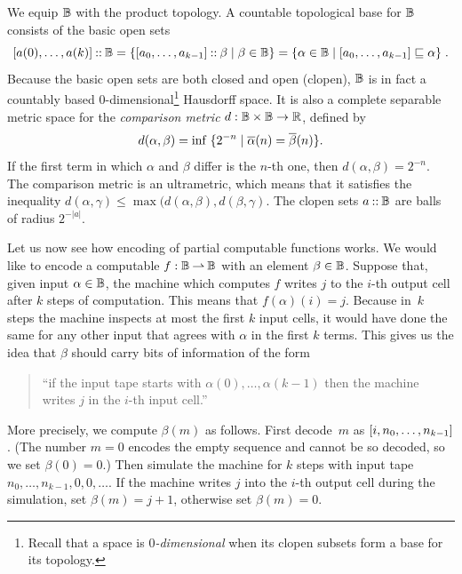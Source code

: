 We equip $\mathbb{B}$ with the product topology. A countable topological
base for $\mathbb{B}$ consists of the basic open sets
%
\begin{equation*}
  [a(0), \ldots, a(k)] \mathbin{{:}{:}} \mathbb{B}
  = \{[a_0, \ldots, a_{k-1}] \mathbin{{:}{:}} \beta \mid \beta \in \mathbb{B}\}
  = \{\alpha \in \mathbb{B} \mid [a_0, \ldots, a_{k-1}]
    \sqsubseteq \alpha\}
  \;.
\end{equation*}
%
Because the basic open sets are both closed and open (clopen),
$\mathbb{B}$ is in fact a countably based $0$-dimensional\footnote{Recall
  that a space is \emph{$0$-dimensional} when its clopen subsets form
  a base for its topology.} Hausdorff space. It is also a complete
separable metric space for the \emph{comparison metric} $d : \mathbb{B}
\times \mathbb{B} \to \mathbb{R}$, defined by
%
\begin{equation*}
  d(\alpha, \beta) = \inf \;\{2^{-n} \mid
    \overline{\alpha}(n) = \overline{\beta}(n)\}.
\end{equation*}
%
If the first term in which $\alpha$ and $\beta$ differ is the $n$-th
one, then $d(\alpha, \beta) = 2^{-n}$. The comparison metric is an
ultrametric, which means that it satisfies the inequality $d(\alpha,
\gamma) \leq \max(d(\alpha, \beta), d(\beta, \gamma)$. The clopen sets
$a \mathbin{{:}{:}} \mathbb{B}$ are balls of radius $2^{-|a|}$.

Let us now see how encoding of partial computable functions works. We
would like to encode a computable $f : \mathbb{B} \mathbin{\rightharpoonup} \mathbb{B}$ with an
element $\beta \in \mathbb{B}$. Suppose that, given input $\alpha \in
\mathbb{B}$, the machine which computes $f$ writes $j$ to the $i$-th
output cell after $k$ steps of computation. This means that
$f(\alpha)(i) = j$. Because in~$k$ steps the machine inspects at most
the first $k$ input cells, it would have done the same for any other
input that agrees with $\alpha$ in the first $k$ terms. This gives us
the idea that $\beta$ should carry bits of information of the form
%
\begin{quote}
  ``if the input tape starts with $\alpha(0), \ldots,
  \alpha(k-1)$ then the machine writes $j$ in the $i$-th input
  cell.''
\end{quote}
%
More precisely, we compute $\beta(m)$ as follows. First decode~$m$ as
$[i, n_0, \ldots, n_{k-1}]$. (The number $m = 0$ encodes the empty
sequence and cannot be so decoded, so we set $\beta(0) = 0$.) Then
simulate the machine for $k$ steps with input tape $n_0, \ldots,
n_{k-1}, 0, 0, \ldots$. If the machine writes $j$ into the $i$-th
output cell during the simulation, set $\beta(m) = j + 1$, otherwise
set $\beta(m) = 0$.

